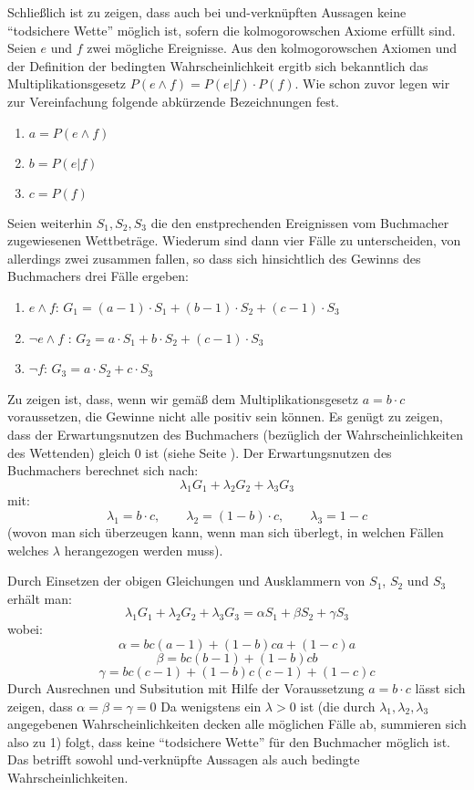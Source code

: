Schließlich ist zu zeigen, dass auch bei und-verknüpften Aussagen keine
"`todsichere Wette"' möglich ist, sofern die kolmogorowschen Axiome erfüllt
sind. Seien $e$ und $f$ zwei mögliche Ereignisse. Aus den kolmogorowschen
Axiomen und der Definition der bedingten Wahrscheinlichkeit ergitb sich
bekanntlich das Multiplikationsgesetz $P(e \wedge f) = P(e|f)\cdot P(f)$. Wie
schon zuvor legen wir zur Vereinfachung folgende abkürzende Bezeichnungen fest.
\begin{enumerate}
   \item $a = P(e \wedge f)$
   \item $b = P(e|f)$
   \item $c = P(f)$
\end{enumerate}
Seien weiterhin $S_1,S_2,S_3$ die den enstprechenden Ereignissen vom
Buchmacher zugewiesenen Wettbeträge. Wiederum sind dann vier Fälle zu
unterscheiden, von allerdings zwei zusammen fallen, so dass sich hinsichtlich
des Gewinns des Buchmachers drei Fälle ergeben:
\begin{enumerate}
  \item $e \wedge f$: 
        $G_1 = (a-1)\cdot S_1 + (b-1)\cdot S_2 + (c-1)\cdot S_3$
  \item $\neg e \wedge f$ :
        $G_2 = a\cdot S_1 + b\cdot S_2 + (c-1)\cdot S_3$
  \item $\neg f$:
        $G_3 = a\cdot S_2 + c\cdot S_3$
\end{enumerate}
Zu zeigen ist, dass, wenn wir gemäß dem Multiplikationsgesetz $a=b\cdot c$
voraussetzen, die Gewinne nicht alle positiv sein können. Es genügt zu zeigen,
dass der Erwartungsnutzen des Buchmachers (bezüglich der Wahrscheinlichkeiten
des Wettenden) gleich 0 ist (siehe Seite \pageref{bmErwartungsnutzen}). 
Der Erwartungsnutzen des
Buchmachers berechnet sich nach: \[ \lambda_1G_1 + \lambda_2G_2 + \lambda_3G_3 \]
mit:
\[ \lambda_1 = b\cdot c, \qquad \lambda_2 = (1-b)\cdot c, \qquad \lambda_3 =
1-c \]
(wovon man sich überzeugen kann, wenn man sich überlegt, in welchen Fällen
welches $\lambda$ herangezogen werden muss).

Durch Einsetzen der obigen Gleichungen und Ausklammern von $S_1$, $S_2$ und
$S_3$ erhält man:
\[ \lambda_1G_1 + \lambda_2G_2 + \lambda_3G_3 = 
   \alpha S_1 + \beta S_2 + \gamma S_3  \]
wobei:
\[ \alpha = bc(a-1) + (1-b)ca + (1-c)a \]
\[ \beta  = bc(b-1) + (1-b)cb  \]
\[ \gamma = bc(c-1) + (1-b)c(c-1) + (1-c)c \]
Durch Ausrechnen und Subsitution mit Hilfe der Voraussetzung $a=b\cdot c$ lässt
sich zeigen, dass $\alpha = \beta = \gamma = 0$
Da wenigstens ein $\lambda > 0$ ist (die durch $\lambda_1,\lambda_2,\lambda_3$
angegebenen Wahrscheinlichkeiten decken alle möglichen Fälle ab, summieren sich
also zu 1) folgt, dass keine "`todsichere Wette"' für den Buchmacher möglich
ist. Das betrifft sowohl und-verknüpfte Aussagen als auch bedingte
Wahrscheinlichkeiten. 

